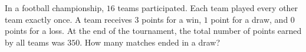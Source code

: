 In a football championship, $16$ teams participated. Each team played every other team exactly once. A team receives $3$ points for a win, $1$ point for a draw, and $0$ points for a loss. At the end of the tournament, the total number of points earned by all teams was $350$. How many matches ended in a draw?
